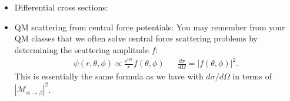 \documentclass[12pt, oneside]{article}   	%
\theoremstyle{definition}
\begin{document}
\begin{itemize}
	\item Differential cross sections: 
	
	\item QM scattering from central force potentials: You may remember from your QM classes that we often solve central force scattering problems by determining the scattering amplitude $f$:
	\begin{align}
		\psi(r, \theta, \phi) \propto \frac{e^{ikr}}{r} f(\theta, \phi) &&
		\frac{d\sigma}{d\Omega} = | f(\theta, \phi) |^2.
	\end{align}
	This is essentially the same formula as we have with $d\sigma / d\Omega$ in terms of $|\mathcal M_{\alpha\rightarrow\beta}|^2$. 

\end{itemize}
\end{document}

